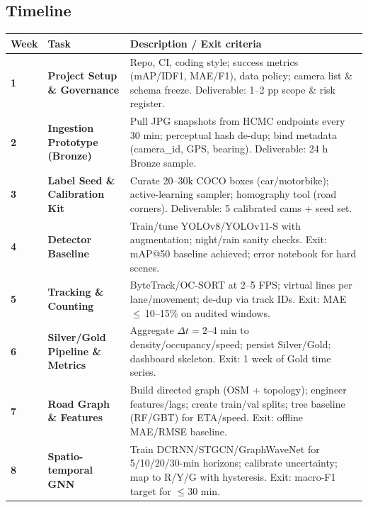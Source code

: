 \subsection{Timeline}
\begin{table}[H]
  \centering
  \renewcommand{\arraystretch}{1.15}
  \begin{tabularx}{\textwidth}{|>{\raggedright}p{1.6cm}|>{\raggedright}p{3.7cm}|>{\raggedright\arraybackslash}X|}
    \hline
    \textbf{Week} & \textbf{Task} & \textbf{Description / Exit criteria} \\
    \hline
    \textbf{1} & \textbf{Project Setup \& Governance} &
    Repo, CI, coding style; success metrics (mAP/IDF1, MAE/F1), data policy; camera list \& schema freeze. Deliverable: 1–2 pp scope \& risk register. \\
    \hline
    \textbf{2} & \textbf{Ingestion Prototype (Bronze)} &
    Pull JPG snapshots from HCMC endpoints every 30 min; perceptual hash de-dup; bind metadata (camera\_id, GPS, bearing). Deliverable: 24 h Bronze sample. \\
    \hline
    \textbf{3} & \textbf{Label Seed \& Calibration Kit} &
    Curate 20–30k COCO boxes (car/motorbike); active-learning sampler; homography tool (road corners). Deliverable: 5 calibrated cams + seed set. \\
    \hline
    \textbf{4} & \textbf{Detector Baseline} &
    Train/tune YOLOv8/YOLOv11-S with augmentation; night/rain sanity checks. Exit: mAP@50 baseline achieved; error notebook for hard scenes. \\
    \hline
    \textbf{5} & \textbf{Tracking \& Counting} &
    ByteTrack/OC-SORT at 2–5 FPS; virtual lines per lane/movement; de-dup via track IDs. Exit: MAE\,$\le$\,10–15\% on audited windows. \\
    \hline
    \textbf{6} & \textbf{Silver/Gold Pipeline \& Metrics} &
    Aggregate $\Delta t=2$–4 min to density/occupancy/speed; persist Silver/Gold; dashboard skeleton. Exit: 1 week of Gold time series. \\
    \hline
    \textbf{7} & \textbf{Road Graph \& Features} &
    Build directed graph (OSM + topology); engineer features/lags; create train/val splits; tree baseline (RF/GBT) for ETA/speed. Exit: offline MAE/RMSE baseline. \\
    \hline
    \textbf{8} & \textbf{Spatio-temporal GNN} &
    Train DCRNN/STGCN/GraphWaveNet for 5/10/20/30-min horizons; calibrate uncertainty; map to R/Y/G with hysteresis. Exit: macro-F1 target for $\le$30 min. \\

\end{tabularx}
\end{table}
